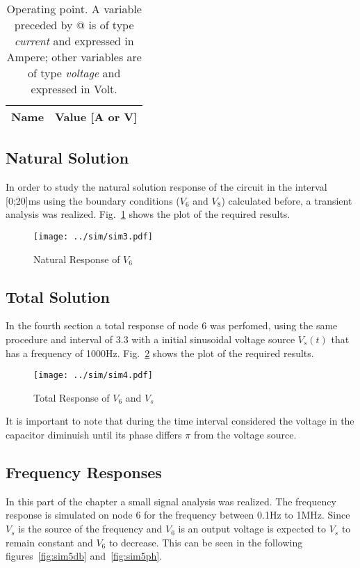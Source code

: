 \begin{table}[!ht]
  \centering
  \begin{tabular}{|l|r|}
    \hline    
    {\bf Name} & {\bf Value [A or V]} \\ \hline
    
  \end{tabular}
  \caption{Operating point. A variable preceded by @ is of type {\em current}
    and expressed in Ampere; other variables are of type {\it voltage} and expressed in
    Volt.}
  \label{tab:op2}
\end{table}


\subsection{Natural Solution}
In order to study the natural solution response of the circuit in the interval [0;20]ms using the boundary conditions ($V_{6}$ and $V_{8}$) calculated before, a transient analysis was realized. 
Fig.~\ref{fig:sim3} shows the plot of the required results.

\begin{figure}[h] \centering
\texttt{[image: ../sim/sim3.pdf]}
\caption{Natural Response of $V_{6}$} 
\label{fig:sim3}
\end{figure}

\subsection{Total Solution}

In the fourth section a total response of node 6 was perfomed, using the same procedure and interval of 3.3 with a initial sinusoidal voltage source $V_{s}(t)$ that has a frequency of 1000Hz. 
Fig.~\ref{fig:sim4} shows the plot of the required results.

\begin{figure}[!ht] \centering
\texttt{[image: ../sim/sim4.pdf]}
\caption{Total Response of $V_{6}$ and $V_{s}$}
\label{fig:sim4}
\end{figure}
It is important to note that during the time interval considered the voltage in the capacitor diminuish until its phase differs $\pi$ from the voltage source.


\subsection{Frequency Responses}

In this part of the chapter a small signal analysis was realized. The frequency response is simulated on node 6 for the frequency between 0.1Hz to 1MHz. 
Since $V_{s}$ is the source of the frequency and $V_{6}$ is an output voltage is expected to $V_{s}$ to remain constant and $V_{6}$ to decrease. This can be seen in the following figures~\ref{fig:sim5db} and~\ref{fig:sim5ph}.

